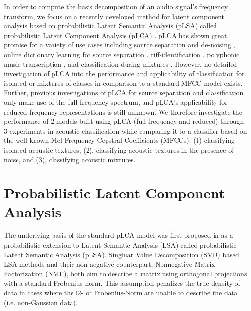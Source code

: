 \documentclass[a4paper,10pt,final]{ThesisStyle}
\begin{document}
In order to compute the basis decomposition of an audio signal's frequency transform, we focus on a recently developed method for latent component analysis based on probabilistic Latent Semantic Analysis (pLSA) \cite{Hofmann1999} called probabilistic Latent Component Analysis (pLCA) \cite{SmaragdisRajShashanka}.   pLCA has shown great promise for a variety of use cases including source separation and de-noising \cite{Smaragdis2007a,Smaragdis2007}, online dictionary learning for source separation \cite{Duan2012}, riff-identification \cite{Weiss2011}, polyphonic music transcription \cite{Benetos2011}, and classification during mixtures \cite{Nam2012}.  However, no detailed investigation of pLCA into the performance and applicability of classification for isolated or mixtures of classes in comparison to a standard MFCC model exists.  Further, previous investigations of pLCA for source separation and classification only make use of the full-frequency spectrum, and pLCA's applicability for reduced frequency representations is still unknown.  We therefore investigate the performance of 2 models built using pLCA (full-frequency and reduced) through 3 experiments in acoustic classification while comparing it to a classifier based on the well known Mel-Frequency Cepstral Coefficients (MFCCs): (1) classifying isolated acoustic textures, (2), classifying acoustic textures in the presence of noise, and (3), classifying acoustic mixtures.  


\section{Probabilistic Latent Component Analysis}
\label{sec:plca}

The underlying basis of the standard pLCA model was first proposed in \cite{Hofmann1999} as a probabilistic extension to Latent Semantic Analysis (LSA) called probabilistic Latent Semantic Analysis (pLSA).  Singluar Value Decomposition (SVD) based LSA methods and their non-negative counterpart, Nonnegative Matrix Factorization (NMF), both aim to describe a matrix using orthogonal projections with a standard Frobenius-norm.  This assumption penalizes the true density of data in cases where the l2- or Frobenius-Norm are unable to describe the data (i.e. non-Gaussian data).  
\end{document}
